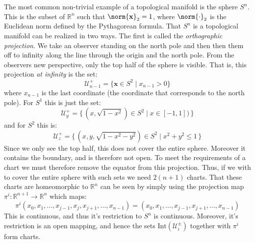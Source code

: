         \begin{example}
            The most common non-trivial example of a topological manifold is
            the sphere $S^{n}$. This is the subset of $\mathbb{R}^{n}$ such that
            $\norm{\mathbf{x}}_{2}=1$, where $\norm{\cdot}_{2}$ is the Euclidean
            norm defined by the Pythagorean formula. That $S^{n}$ is a
            topological manifold can be realized in two ways. The first is
            called the \textit{orthographic projection}. We take an observer
            standing on the north pole and then then them off to infinity along
            the line through the origin and the north pole. From the observers
            new perspective, only the top half of the sphere is visible. That
            is, this projection \textit{at infinity} is the set:
            \begin{equation}
                \mathcal{U}_{n-1}^{+}=\big\{\mathbf{x}\in{S}^{2}\;|\;x_{n-1}>0\}
            \end{equation}
            where $x_{n-1}$ is the last coordinate (the coordinate that
            corresponds to the north pole). For $S^{1}$ this is just the set:
            \begin{equation}
                \mathcal{U}_{y}^{+}=
                    \{\,(x,\sqrt{1-x^{2}})\in{S}^{2}\;|\;x\in[-1,1])\,\}
            \end{equation}
            and for $S^{2}$ this is:
            \begin{equation}
                \mathcal{U}_{z}^{+}=
                    \{\,(x,y,\sqrt{1-x^{2}-y^{2}})\in{S}^{2}\;
                    |\;x^{2}+y^{2}\leq{1}\,\}
            \end{equation}
            Since we only see the top half, this does not cover the entire
            sphere. Moreover it contains the boundary, and is therefore not
            open. To meet the requirements of a chart we must therefore remove
            the equator from this projection. Thus, if we with to cover the
            entire sphere with such sets we need $2(n+1)$ charts. That these
            charts are homeomorphic to $\mathbb{R}^{n}$ can be seen by simply
            using the projection map
            $\pi^{i}:\mathbb{R}^{n+1}\rightarrow\mathbb{R}^{n}$ which maps:
            \begin{equation}
                \pi^{i}(x_{0},x_{1},\dots,x_{j-1},x_{j},x_{j+1},\dots,x_{n-1})
                =(x_{0},x_{1},\dots,x_{j-1},x_{j+1},\dots,x_{n-1})
            \end{equation}
            This is continuous, and thus it's restriction to $S^{n}$ is
            continuous. Moreover, it's restriction is an open mapping, and hence
            the sets $\textrm{Int}(\mathcal{U}_{i}^{\pm})$ together with
            $\pi^{i}$ form charts.
        \end{example}
